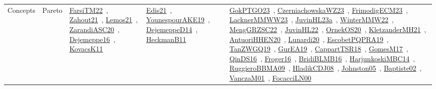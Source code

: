 {\begin{longtable}{lp{3cm}>{\raggedright\arraybackslash}p{6cm}>{\raggedright\arraybackslash}p{6cm}>{\raggedright\arraybackslash}p{8cm}}
\index{Pareto}\index{Concepts!Pareto}Concepts & Pareto & \href{../works/FarsiTM22.pdf}{FarsiTM22}~\cite{FarsiTM22}, \href{../works/Zahout21.pdf}{Zahout21}~\cite{Zahout21}, \href{../works/Lemos21.pdf}{Lemos21}~\cite{Lemos21}, \href{../works/ZarandiASC20.pdf}{ZarandiASC20}~\cite{ZarandiASC20}, \href{../works/Dejemeppe16.pdf}{Dejemeppe16}~\cite{Dejemeppe16}, \href{../works/KovacsK11.pdf}{KovacsK11}~\cite{KovacsK11} & \href{../works/Edis21.pdf}{Edis21}~\cite{Edis21}, \href{../works/YounespourAKE19.pdf}{YounespourAKE19}~\cite{YounespourAKE19}, \href{../works/DejemeppeD14.pdf}{DejemeppeD14}~\cite{DejemeppeD14}, \href{../works/HeckmanB11.pdf}{HeckmanB11}~\cite{HeckmanB11} & \href{../works/GokPTGO23.pdf}{GokPTGO23}~\cite{GokPTGO23}, \href{../works/CzerniachowskaWZ23.pdf}{CzerniachowskaWZ23}~\cite{CzerniachowskaWZ23}, \href{../works/FrimodigECM23.pdf}{FrimodigECM23}~\cite{FrimodigECM23}, \href{../works/LacknerMMWW23.pdf}{LacknerMMWW23}~\cite{LacknerMMWW23}, \href{../works/JuvinHL23a.pdf}{JuvinHL23a}~\cite{JuvinHL23a}, \href{../works/WinterMMW22.pdf}{WinterMMW22}~\cite{WinterMMW22}, \href{../works/MengGRZSC22.pdf}{MengGRZSC22}~\cite{MengGRZSC22}, \href{../works/JuvinHL22.pdf}{JuvinHL22}~\cite{JuvinHL22}, \href{../works/OrnekOS20.pdf}{OrnekOS20}~\cite{OrnekOS20}, \href{../works/KletzanderMH21.pdf}{KletzanderMH21}~\cite{KletzanderMH21}, \href{../works/AntuoriHHEN20.pdf}{AntuoriHHEN20}~\cite{AntuoriHHEN20}, \href{../works/Lunardi20.pdf}{Lunardi20}~\cite{Lunardi20}, \href{../works/EscobetPQPRA19.pdf}{EscobetPQPRA19}~\cite{EscobetPQPRA19}, \href{../works/TanZWGQ19.pdf}{TanZWGQ19}~\cite{TanZWGQ19}, \href{../works/GurEA19.pdf}{GurEA19}~\cite{GurEA19}, \href{../works/CappartTSR18.pdf}{CappartTSR18}~\cite{CappartTSR18}, \href{../works/GomesM17.pdf}{GomesM17}~\cite{GomesM17}, \href{../works/QinDS16.pdf}{QinDS16}~\cite{QinDS16}, \href{../works/Froger16.pdf}{Froger16}~\cite{Froger16}, \href{../works/BridiBLMB16.pdf}{BridiBLMB16}~\cite{BridiBLMB16}, \href{../works/HarjunkoskiMBC14.pdf}{HarjunkoskiMBC14}~\cite{HarjunkoskiMBC14}, \href{../works/RuggieroBBMA09.pdf}{RuggieroBBMA09}~\cite{RuggieroBBMA09}, \href{../works/HladikCDJ08.pdf}{HladikCDJ08}~\cite{HladikCDJ08}, \href{../works/Johnston05.pdf}{Johnston05}~\cite{Johnston05}, \href{../works/Baptiste02.pdf}{Baptiste02}~\cite{Baptiste02}, \href{../works/VanczaM01.pdf}{VanczaM01}~\cite{VanczaM01}, \href{../works/FocacciLN00.pdf}{FocacciLN00}~\cite{FocacciLN00}\\

\end{longtable}}
